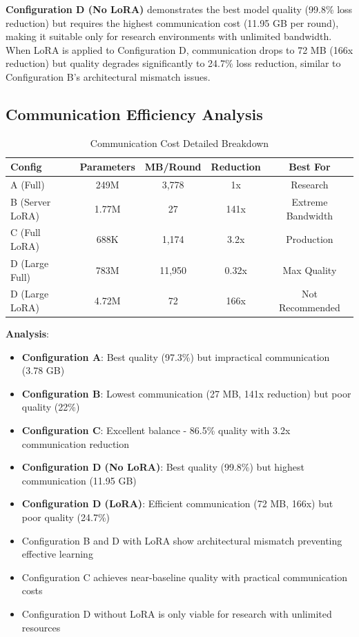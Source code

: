 \documentclass[acmsmall,screen]{acmart}
\begin{document}
\textbf{Configuration D (No LoRA)} demonstrates the best model quality (99.8\% loss reduction) but requires the highest communication cost (11.95 GB per round), making it suitable only for research environments with unlimited bandwidth. When LoRA is applied to Configuration D, communication drops to 72 MB (166x reduction) but quality degrades significantly to 24.7\% loss reduction, similar to Configuration B's architectural mismatch issues.

\subsection{Communication Efficiency Analysis}

\begin{table}[h]
\centering
\caption{Communication Cost Detailed Breakdown}
\label{tab:communication}
\begin{tabular}{@{}lcccc@{}}
\toprule
\textbf{Config} & \textbf{Parameters} & \textbf{MB/Round} & \textbf{Reduction} & \textbf{Best For} \\
\midrule
A (Full) & 249M & 3,778 & 1x & Research \\
B (Server LoRA) & 1.77M & 27 & 141x & Extreme Bandwidth \\
C (Full LoRA) & 688K & 1,174 & 3.2x & Production \\
D (Large Full) & 783M & 11,950 & 0.32x & Max Quality \\
D (Large LoRA) & 4.72M & 72 & 166x & Not Recommended \\
\bottomrule
\end{tabular}
\end{table}

\textbf{Analysis}:
\begin{itemize}
    \item \textbf{Configuration A}: Best quality (97.3\%) but impractical communication (3.78 GB)
    \item \textbf{Configuration B}: Lowest communication (27 MB, 141x reduction) but poor quality (22\%)
    \item \textbf{Configuration C}: Excellent balance - 86.5\% quality with 3.2x communication reduction
    \item \textbf{Configuration D (No LoRA)}: Best quality (99.8\%) but highest communication (11.95 GB)
    \item \textbf{Configuration D (LoRA)}: Efficient communication (72 MB, 166x) but poor quality (24.7\%)
    \item Configuration B and D with LoRA show architectural mismatch preventing effective learning
    \item Configuration C achieves near-baseline quality with practical communication costs
    \item Configuration D without LoRA is only viable for research with unlimited resources
\end{itemize}
\end{document}
